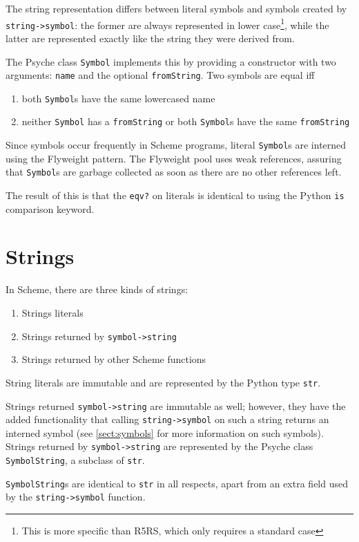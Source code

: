 \documentclass{report}
\newcommand{\code}[1]{\texttt{#1}}
\begin{document}
The string representation differs between literal symbols and symbols
created by \code{string->symbol}: the former are always
represented in lower case\footnote{This is more specific than R5RS,
which only requires a standard case}, while the latter are represented
exactly like the string they were derived from.

The Psyche class \code{Symbol} implements this by providing a
constructor with two arguments: \code{name} and the optional
\code{fromString}. Two symbols are equal iff 
\begin{enumerate}
\item both \code{Symbol}s have the same lowercased name
\item neither \code{Symbol} has a \code{fromString} or both
\code{Symbol}s have the same \code{fromString}
\end{enumerate}

Since symbols occur frequently in Scheme programs, literal
\code{Symbol}s are interned using the Flyweight pattern. The
Flyweight pool uses weak references, assuring that \code{Symbol}s are
garbage collected as soon as there are no other references left.

The result of this is that the \code{eqv?} on literals is
identical to using the Python \code{is} comparison keyword.

\section{Strings}
\label{sect:strings}

In Scheme, there are three kinds of strings:
\begin{enumerate}
\item Strings literals
\item Strings returned by \code{symbol->string}
\item Strings returned by other Scheme functions
\end{enumerate}

String literals are immutable and are represented by the Python type
\code{str}. 

Strings returned \code{symbol->string} are immutable as well;
however, they have the added functionality that calling
\code{string->symbol} on such a string returns an interned symbol
(see \ref{sect:symbols} for more information on such symbols). Strings
returned by \code{symbol->string} are represented by the Psyche
class \code{SymbolString}, a subclass of \code{str}.

\code{SymbolString}s are identical to \code{str} in all respects,
apart from an extra field used by the \code{string->symbol}
function. 
\end{document}
